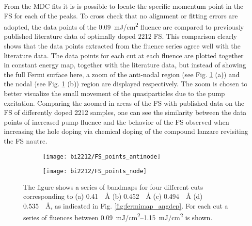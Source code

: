 From the MDC fits it is is possible to locate the specific momentum point in the FS for each of the peaks.
To cross check that no alignment or fitting errors are adopted, the data points of the \qty{0.09}{\milli\joule/\centi\meter\squared} fluence are compared to previously published literature data of optimally doped 2212 FS.
This comparison clearly shows that the data points extracted from the fluence series agree well with the literature data.
The data points for each cut at each fluence are plotted together in constant energy map, together with the literature data, but instead of showing the full Fermi surface here, a zoom of the anti-nodal region (see Fig. \ref{fig:FS_points_zoom} (a)) and the nodal (see Fig. \ref{fig:FS_points_zoom} (b)) region are displayed respectively.
The zoom is chosen to better visualize the small movement of the quasiparticles due to the pump excitation.
Comparing the zoomed in areas of the FS with published data on the FS of differently doped 2212 samples, one can see the similarity between the data points of increased pump fluence and the behavior of the FS observed when increasing the hole doping via chemical doping of the compound \cite{} lanzare revisiting the FS nautre.

\begin{figure}[b!]
	\centering
	\begin{subfigure}[b]{0.49\textwidth}
		\texttt{[image: bi2212/FS\_points\_antinode]}
		\caption{}
	\end{subfigure}
	\hfill
	\begin{subfigure}[b]{0.49\textwidth}
		\texttt{[image: bi2212/FS\_points\_node]}
		\caption{}
	\end{subfigure}
	\caption{The figure shows a series of bandmaps for four different cuts corresponding to (a) \qty{0.41}{\per\angstrom} (b) \qty{0.452}{\per\angstrom} (c) \qty{0.494}{\per\angstrom} (d) \qty{0.535}{\per\angstrom}, as indicated in Fig. \ref{fig:fermimap_angdep}. For each cut a series of fluences between \qtyrange{0.09}{1.15}{\milli\joule/\centi\meter\squared} is shown.}
	\label{fig:FS_points_zoom}
\end{figure}

